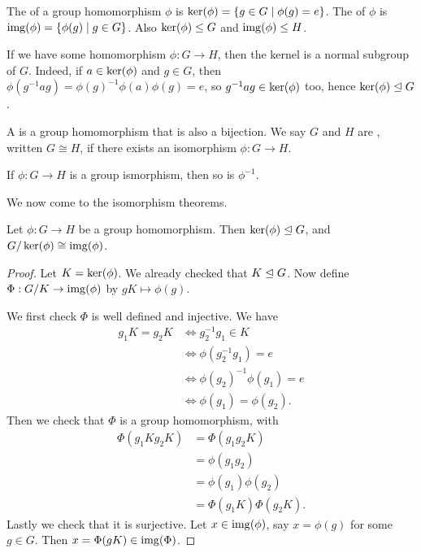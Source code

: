 \documentclass[a4paper]{scrartcl}
\begin{document}
\begin{definition}
	The  of a group homomorphism $\phi$ is $\operatorname{ker}(\phi) = \{ g \in G \mid \phi(g) = e\}$.
	The  of $\phi$ is $\operatorname{img}(\phi) = \{ \phi(g) \mid g \in G\}$. Also $\operatorname{ker}(\phi) \leq G$ and $\operatorname{img}(\phi) \leq H$.
\end{definition}



If we have some homomorphism $\phi: G \rightarrow H$, 
then the kernel is a normal subgroup of $G$. Indeed, if $a \in \operatorname{ker}(\phi)$ and $g \in G$, then $\phi(g^{-1}ag) = \phi(g)^{-1} \phi(a) \phi(g) = e$, so $g^{-1}ag \in \operatorname{ker}(\phi)$ too, hence $\operatorname{ker}(\phi) \trianglelefteq G$.

\begin{definition}
	A  is a group homomorphism that is also a bijection. We say $G$ and $H$ are , written $G \cong H$, if there exists an isomorphism $\phi:G \rightarrow H$.
\end{definition}

\begin{remark}
	If $\phi:G \rightarrow H$ is a group ismorphism, then so is $\phi^{-1}$.
\end{remark}

We now come to the isomorphism theorems.

\begin{theorem}
	Let $\phi: G \rightarrow H$ be a group homomorphism. Then $\operatorname{ker}(\phi) \trianglelefteq G$, and $G/\operatorname{ker}(\phi) \cong \operatorname{img}(\phi)$.
\end{theorem}
\begin{proof}
	Let $K = \operatorname{ker}(\phi)$. We already checked that $K \trianglelefteq G$. Now define $\Phi: G/K \rightarrow \operatorname{img}(\phi)$ by $gK \mapsto \phi(g)$.

	We first check $\Phi$ is well defined and injective. We have
	\begin{align*}
		g_1K = g_2K &\iff g_2^{-1} g_1 \in K \\
		&\iff \phi(g_2^{-1}g_1) = e \\
		&\iff \phi(g_2)^{-1} \phi(g_1) = e  \\
		&\iff \phi(g_1) = \phi(g_2).
	\end{align*}
	Then we check that $\Phi$ is a group homomorphism, with
	\begin{align*}
		\Phi(g_1 K g_2 K) &= \Phi(g_1 g_2 K) \\
			&= \phi(g_1 g_2) \\
			&= \phi(g_1) \phi(g_2) \\
			&= \Phi(g_1 K) \Phi(g_2 K).
	\end{align*}
	Lastly we check that it is surjective. Let $x \in \operatorname{img}(\phi)$, say $x = \phi(g)$ for some $g \in G$. Then $x = \Phi(gK) \in \operatorname{img}(\Phi)$.
\end{proof}
\end{document}
